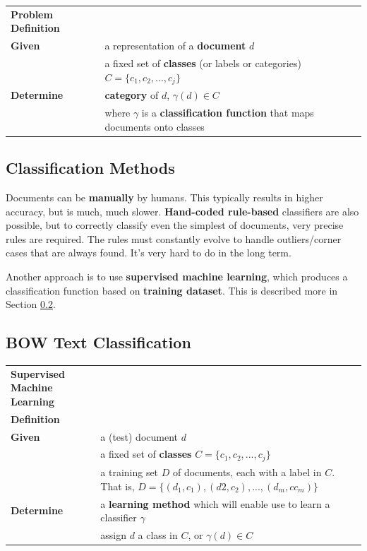 \documentclass{article}
\begin{document}
\begin{tabular}{ll}
\textbf{Problem Definition} \\
\textbf{Given} & a representation of a \textbf{document} $d$ \\
& a fixed set of \textbf{classes} (or labels or categories) $C = \lbrace c_1, c_2, ..., c_j \rbrace$ \\
\textbf{Determine} & \textbf{category} of $d$, $\gamma(d) \in C$ \\
& where $\gamma$ is a \textbf{classification function} that maps documents onto classes \\
\end{tabular}

\subsection{Classification Methods}

Documents can be \textbf{manually} by humans. This typically results in higher accuracy, but is much, much slower. \textbf{Hand-coded rule-based} classifiers are also possible, but to correctly classify even the simplest of documents, very precise rules are required. The rules must constantly evolve to handle outliers/corner cases that are always found. It's very hard to do in the long term.

Another approach is to use \textbf{supervised machine learning}, which produces a classification function based on \textbf{training dataset}. This is described more in Section \ref{sec:bow-text-classification}.

\subsection{BOW Text Classification}
\label{sec:bow-text-classification}

\begin{tabular}{p{7cm}p{10cm}}
\textbf{Supervised Machine Learning} \\
\textbf{Definition} \\
\textbf{Given} & a (test) document $d$ \\
	& a fixed set of \textbf{classes} $C = \lbrace c_1, c_2, ..., c_j \rbrace$ \\
	& a training set $D$ of documents, each with a label in $C$. That is, $D = \lbrace (d_1, c_1), (d2, c_2), ..., (d_m,c c_m) \rbrace$ \\
\textbf{Determine} & a \textbf{learning method} which will enable use to learn a classifier $\gamma$ \\
	& assign $d$ a class in $C$, or $\gamma(d) \in C$
\end{tabular}
\end{document}
